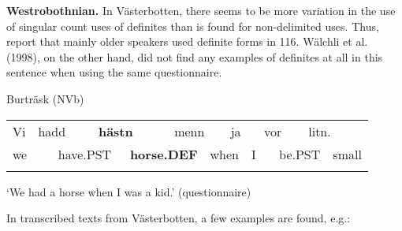 \begin{styleBodytextC}
\textbf{Westrobothnian.} In Västerbotten, there seems to be more variation in the use of singular count uses of definites than is found for non-delimited uses. Thus, \citet{BergholmEtAl1999} report that mainly older speakers used definite forms in 116. Wälchli et al. (1998), on the other hand, did not find any examples of definites at all in this sentence when using the same questionnaire.

\end{styleBodytextC}

\begin{listWWNumileveli}
\item {}

\begin{styleExample}
\label{bkm:Ref224103495}Burträsk (NVb)

\end{styleExample}

\end{listWWNumileveli}

\begin{tabular}{llllllllllllll}
\lsptoprule
Vi & \multicolumn{2}{l}{hadd

} & \multicolumn{2}{l}{{\bfseries hästn}

} & \multicolumn{2}{l}{menn

} & \multicolumn{2}{l}{ja

} & \multicolumn{2}{l}{vor

} & \multicolumn{2}{l}{litn.

} & \\
\multicolumn{2}{l}{we

} & \multicolumn{2}{l}{have.PST

} & \multicolumn{2}{l}{{\bfseries horse.DEF}

} & \multicolumn{2}{l}{when

} & \multicolumn{2}{l}{I 

} & \multicolumn{2}{l}{be.PST

} & \multicolumn{2}{l}{small

}\\
\lspbottomrule
\end{tabular}

\begin{styleTranslation}
‘We had a horse when I was a kid.’ (questionnaire)

\end{styleTranslation}

\begin{styleBodyTextFirst}
In transcribed texts from Västerbotten, a few examples are found, e.g.:

\end{styleBodyTextFirst}


